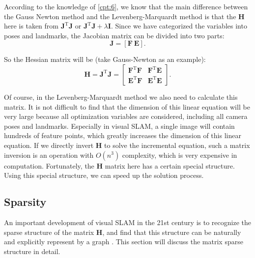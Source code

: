 According to the knowledge of \ref{cpt:6}, we know that the main difference between the Gauss Newton method and the Levenberg-Marquardt method is that the $\mathbf{H}$ here is taken from $\mathbf{J }^\mathrm{T}\mathbf{J}$ or $\mathbf{J}^\mathrm{T}\mathbf{J}+ \lambda \mathbf{I}$. Since we have categorized the variables into poses and landmarks, the Jacobian matrix can be divided into two parts:
\begin{equation}
	\mathbf{J}=[\mathbf{F} \ \mathbf{E}].
\end{equation}

So the Hessian matrix will be (take Gauss-Newton as an example): 
\begin{equation}\label{eq:HessianMatrix}
	\mathbf{H} = \mathbf{J}^\mathrm{T}\mathbf{J} =
	\begin{bmatrix}
		\mathbf{F}^\mathrm{T}\mathbf{F}   &   \mathbf{F}^\mathrm{T}\mathbf{E}   \\ 
		\mathbf{E}^\mathrm{T}\mathbf{F}   &   \mathbf{E}^\mathrm{T}\mathbf{E}
	\end{bmatrix} .
\end{equation}

Of course, in the Levenberg-Marquardt method we also need to calculate this matrix. It is not difficult to find that the dimension of this linear equation will be very large because all optimization variables are considered, including all camera poses and landmarks. Especially in visual SLAM, a single image will contain hundreds of feature points, which greatly increases the dimension of this linear equation. If we directly invert $\mathbf{H}$ to solve the incremental equation, such a matrix inversion is an operation \textsuperscript{\cite{Sueli2003}} with $O(n^3)$ complexity, which is very expensive in computation. Fortunately, the $\mathbf{H}$ matrix here has a certain special structure. Using this special structure, we can speed up the solution process.

\subsection{Sparsity}
An important development of visual SLAM in the 21st century is to recognize the sparse structure of the matrix $\mathbf{H}$, and find that this structure can be naturally and explicitly represent by a graph \textsuperscript{\cite{Kummerle2011, Polok2013}}. This section will discuss the matrix sparse structure in detail.

